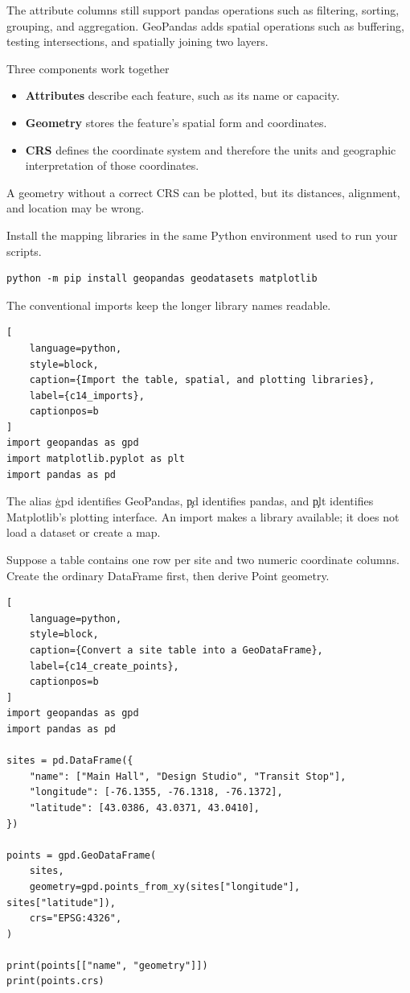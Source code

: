 The attribute columns still support pandas operations such as filtering,
sorting, grouping, and aggregation. GeoPandas adds spatial operations such as
buffering, testing intersections, and spatially joining two layers.

\begin{SyntaxBox}{Three components work together}
\begin{itemize}
    \item \textbf{Attributes} describe each feature, such as its name or capacity.
    \item \textbf{Geometry} stores the feature's spatial form and coordinates.
    \item \textbf{CRS} defines the coordinate system and therefore the units and
          geographic interpretation of those coordinates.
\end{itemize}
A geometry without a correct CRS can be plotted, but its distances, alignment,
and location may be wrong.
\end{SyntaxBox}


Install the mapping libraries in the same Python environment used to run your
scripts.

\begin{verbatim}
python -m pip install geopandas geodatasets matplotlib
\end{verbatim}

The conventional imports keep the longer library names readable.

\begin{lstlisting}[
    language=python,
    style=block,
    caption={Import the table, spatial, and plotting libraries},
    label={c14_imports},
    captionpos=b
]
import geopandas as gpd
import matplotlib.pyplot as plt
import pandas as pd
\end{lstlisting}

The alias \c{gpd} identifies GeoPandas, \c{pd} identifies pandas, and \c{plt}
identifies Matplotlib's plotting interface. An import makes a library available;
it does not load a dataset or create a map.


Suppose a table contains one row per site and two numeric coordinate columns.
Create the ordinary DataFrame first, then derive Point geometry.

\begin{lstlisting}[
    language=python,
    style=block,
    caption={Convert a site table into a GeoDataFrame},
    label={c14_create_points},
    captionpos=b
]
import geopandas as gpd
import pandas as pd

sites = pd.DataFrame({
    "name": ["Main Hall", "Design Studio", "Transit Stop"],
    "longitude": [-76.1355, -76.1318, -76.1372],
    "latitude": [43.0386, 43.0371, 43.0410],
})

points = gpd.GeoDataFrame(
    sites,
    geometry=gpd.points_from_xy(sites["longitude"], sites["latitude"]),
    crs="EPSG:4326",
)

print(points[["name", "geometry"]])
print(points.crs)
\end{lstlisting}

